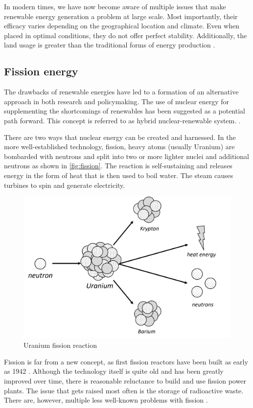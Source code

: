   In modern times, we have now become aware of multiple issues
  that make renewable energy generation a problem at large scale.
  Most importantly, their efficacy varies depending on the geographical
  location and climate. Even when placed in optimal conditions,
  they do not offer perfect stability. Additionally, the land
  usage is greater than the traditional forms of energy production
  \cite{renewable_problems}.

\subsection{Fission energy}

  The drawbacks of renewable energies have led to a formation
  of an alternative approach in both research and policymaking. 
  The use of nuclear energy for supplementing the shortcomings 
  of renewables has been suggested as a potential path forward.
  This concept is referred to as hybrid nuclear-renewable system.
  \cite{hybrid_nuclear_renewable}. 

  There are two ways that nuclear energy can be created and harnessed.
  In the more well-established technology, fission, heavy atoms 
  (usually Uranium) are bombarded with neutrons 
  and split into two or more lighter nuclei and
  additional neutrons as shown in \autoref{fig:fission}.
  The reaction is self-sustaining 
  and releases energy in the form of heat that is then used
  to boil water. The steam causes turbines to spin
  and generate electricity.
	\begin{figure}[H]
	  \centering
	  \includegraphics[width=.75\linewidth]{media/fission.png}
	  \caption{Uranium fission reaction}
	  \label{fig:fission}
	\end{figure}

  Fission is far from a new concept, as first fission reactors have been 
  built as early as 1942 \cite{first_fission_reactor}. 
  Although the technology itself is quite old 
  and has been greatly improved over time, 
  there is reasonable reluctance to build and use fission power plants. 
  The issue that gets raised most often is the storage of radioactive waste. 
  There are, however, multiple less well-known
  problems with fission \cite{fission_problems}. 


